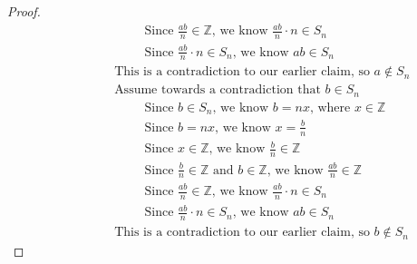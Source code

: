 \documentclass{article}
\begin{document}
\begin{enumerate}
\begin{enumerate}
\begin{proof}
\begin{align}
                &\quad \hspace{2cm} \text{Since } \frac{ab}{n} \in \mathbb{Z} \text{, we know } \frac{ab}{n} \cdot n \in S_n \\
                &\quad \hspace{2cm} \text{Since } \frac{ab}{n} \cdot n \in S_n \text{, we know } ab \in S_n \\
                &\quad \hspace{1cm} \text{This is a contradiction to our earlier claim, so } a \notin S_n \\
                &\quad \hspace{1cm} \text{Assume towards a contradiction that } b \in S_n \\
                &\quad \hspace{2cm} \text{Since } b \in S_n \text{, we know } b = nx \text{, where } x \in \mathbb{Z} \\
                &\quad \hspace{2cm} \text{Since } b = nx \text{, we know } x = \frac{b}{n} \\
                &\quad \hspace{2cm} \text{Since } x \in \mathbb{Z} \text{, we know } \frac{b}{n} \in \mathbb{Z} \\
                &\quad \hspace{2cm} \text{Since } \frac{b}{n} \in \mathbb{Z} \text{ and } b \in \mathbb{Z} \text{, we know } \frac{ab}{n} \in \mathbb{Z} \\
                &\quad \hspace{2cm} \text{Since } \frac{ab}{n} \in \mathbb{Z} \text{, we know } \frac{ab}{n} \cdot n \in S_n \\
                &\quad \hspace{2cm} \text{Since } \frac{ab}{n} \cdot n \in S_n \text{, we know } ab \in S_n \\
                &\quad \hspace{1cm} \text{This is a contradiction to our earlier claim, so } b \notin S_n
            \end{align}
        \end{proof}
    \end{enumerate}
\end{enumerate}
\end{document}
